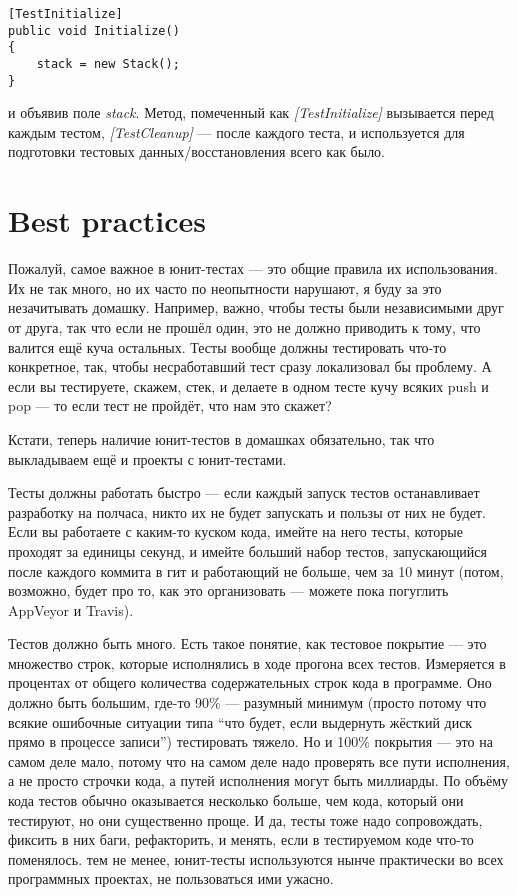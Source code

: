 \documentclass[a5paper]{article}
\begin{document}
\begin{verbatim}
[TestInitialize]
public void Initialize()
{
    stack = new Stack();
}
\end{verbatim}

и объявив поле \textit{stack}. Метод, помеченный как \textit{[TestInitialize]} вызывается перед каждым тестом, \textit{[TestCleanup]} --- после каждого теста, и используется для подготовки тестовых данных/восстановления всего как было. 

\section{Best practices}

Пожалуй, самое важное в юнит-тестах --- это общие правила их использования. Их не так много, но их часто по неопытности нарушают, я буду за это незачитывать домашку. Например, важно, чтобы тесты были независимыми друг от друга, так что если не прошёл один, это не должно приводить к тому, что валится ещё куча остальных. Тесты вообще должны тестировать что-то конкретное, так, чтобы несработавший тест сразу локализовал бы проблему. А если вы тестируете, скажем, стек, и делаете в одном тесте кучу всяких push и pop --- то если тест не пройдёт, что нам это скажет?

Кстати, теперь наличие юнит-тестов в домашках обязательно, так что выкладываем ещё и проекты с юнит-тестами.

Тесты должны работать быстро --- если каждый запуск тестов останавливает разработку на полчаса, никто их не будет запускать и пользы от них не будет. Если вы работаете с каким-то куском кода, имейте на него тесты, которые проходят за единицы секунд, и имейте больший набор тестов, запускающийся после каждого коммита в гит и работающий не больше, чем за 10 минут (потом, возможно, будет про то, как это организовать --- можете пока погуглить AppVeyor и Travis).

Тестов должно быть много. Есть такое понятие, как тестовое покрытие --- это множество строк, которые исполнялись в ходе прогона всех тестов. Измеряется в процентах от общего количества содержательных строк кода в программе. Оно должно быть большим, где-то 90\% --- разумный минимум (просто потому что всякие ошибочные ситуации типа ``что будет, если выдернуть жёсткий диск прямо в процессе записи'') тестировать тяжело. Но и 100\% покрытия --- это на самом деле мало, потому что на самом деле надо проверять все пути исполнения, а не просто строчки кода, а путей исполнения могут быть миллиарды. По объёму кода тестов обычно оказывается несколько больше, чем кода, который они тестируют, но они существенно проще. И да, тесты тоже надо сопровождать, фиксить в них баги, рефакторить, и менять, если в тестируемом коде что-то поменялось. тем не менее, юнит-тесты используются нынче практически во всех программных проектах, не пользоваться ими ужасно.
\end{document}
